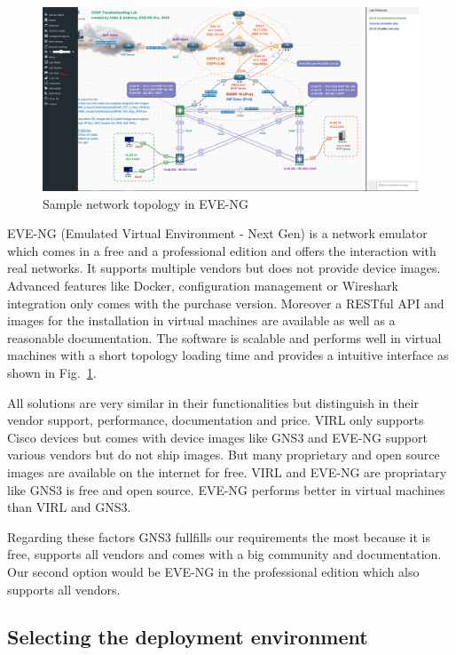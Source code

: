 \documentclass[conference]{IEEEtran}
\begin{document}
\begin{figure}[htbp]
\centerline{\includegraphics[scale=0.19]{eve-ng.png}}
\caption{Sample network topology in EVE-NG \cite{b6}}
\label{eve-ng}
\end{figure}

EVE-NG (Emulated Virtual Environment - Next Gen) is a network emulator which comes in a free and a professional edition and offers the interaction with real networks. It supports multiple vendors but does not provide device images. Advanced features like Docker, configuration management or Wireshark integration only comes with the purchase version. Moreover a RESTful API and images for the installation in virtual machines are available as well as a reasonable documentation. The software is scalable and performs well in virtual machines with a short topology loading time and provides a intuitive interface as shown in Fig.~\ref{eve-ng}.  \cite{b1} \cite{b7}

All solutions are very similar in their functionalities but distinguish in their vendor support, performance, documentation and price. VIRL only supports Cisco devices but comes with device images like GNS3 and EVE-NG support various vendors but do not ship images. But many proprietary and open source images are available on the internet for free. VIRL and EVE-NG are propriatary like GNS3 is free and open source. EVE-NG performs better in virtual machines than VIRL and GNS3.

Regarding these factors GNS3 fullfills our requirements the most because it is free, supports all vendors and comes with a big community and documentation. Our second option would be EVE-NG in the professional edition which also supports all vendors.

\subsection{Selecting the deployment environment}
\end{document}
